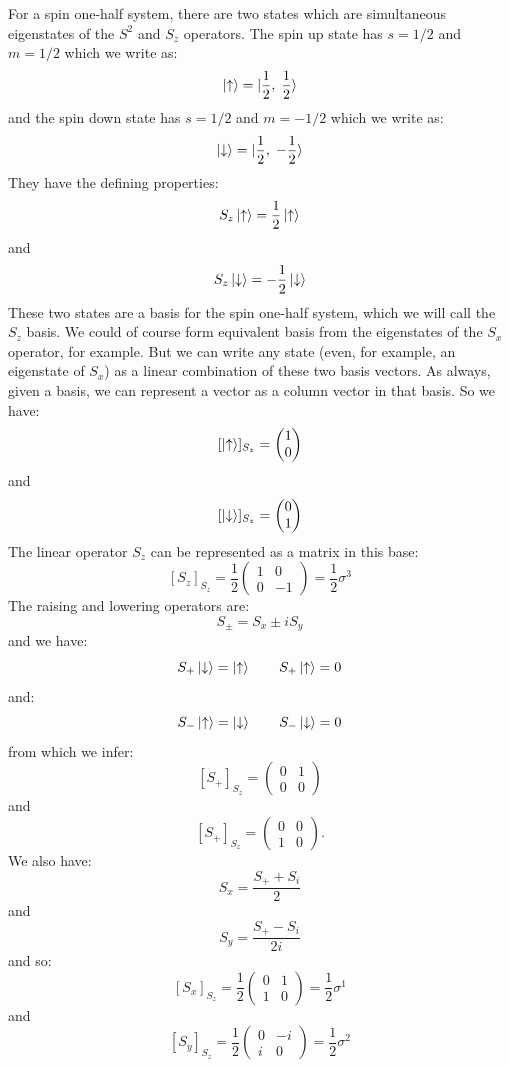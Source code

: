 \documentclass[12pt]{article}
\begin{document}
For a spin one-half system, there are two states which are
simultaneous eigenstates of the $S^2$ and $S_z$ operators.  The spin
up state has $s=1/2$ and $m=1/2$ which we write as:
$$\ket{\uparrow} = \ket{\frac{1}{2}, \; \frac{1}{2}}$$
and the spin down state has $s=1/2$ and $m=-1/2$ which we write as:
$$\ket{\downarrow} = \ket{\frac{1}{2}, \; -\frac{1}{2}}$$
They have the defining properties:
$$S_z \ket{\uparrow} = \frac{1}{2} \ket{\uparrow}$$
and
$$S_z \ket{\downarrow} = -\frac{1}{2} \ket{\downarrow}$$
These two states are a basis for the spin one-half system, which we will call
the $S_z$ basis.  We could of course form equivalent basis from the
eigenstates of the $S_x$ operator, for example.  But we can write any
state (even, for example, an eigenstate of $S_x$) as a linear
combination of these two basis vectors.  As always, given a basis, we
can represent a vector as a column vector in that basis.  So we have:
$$[\ket{\uparrow}]_{S_z} = \begin{pmatrix} 1 \\ 0 \end{pmatrix}$$
and
$$[\ket{\downarrow}]_{S_z} = \begin{pmatrix} 0 \\ 1 \end{pmatrix}$$
The linear operator $S_z$ can be represented as a matrix in this base:
$$[S_z]_{S_z} = \frac{1}{2} \begin{pmatrix} 1 & 0 \\ 0 & -1 \end{pmatrix} = \frac{1}{2} \sigma^3$$
The raising and lowering operators are:
$$S_\pm = S_x \pm i S_y$$
and we have:
$$S_+ \ket{\downarrow} =  \ket{\uparrow} \quad \quad S_+ \ket{\uparrow} = 0$$
and:
$$S_- \ket{\uparrow} =  \ket{\downarrow} \quad \quad S_- \ket{\downarrow} = 0$$
from which we infer:
$$[S_+]_{S_z} =  \begin{pmatrix} 0 & 1 \\ 0 & 0 \end{pmatrix}$$
and
$$[S_+]_{S_z} =  \begin{pmatrix} 0 & 0 \\ 1 & 0 \end{pmatrix}.$$
We also have:
$$S_x = \frac{S_+ + S_i}{2}$$
and
$$S_y = \frac{S_+ - S_i}{2i}$$
and so:
$$[S_x]_{S_z} =  \frac{1}{2} \begin{pmatrix} 0 & 1 \\ 1 & 0 \end{pmatrix} = \frac{1}{2} \sigma^1$$
and
$$[S_y]_{S_z} =  \frac{1}{2} \begin{pmatrix} 0 & -i \\ i & 0 \end{pmatrix} = \frac{1}{2} \sigma^2$$
\end{document}
